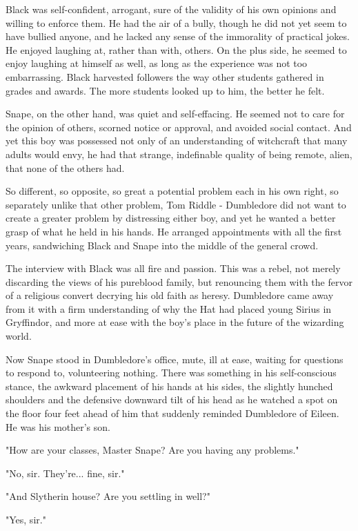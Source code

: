 \documentclass[a4paper,11pt]{article}
\begin{document}
Black was self-confident, arrogant, sure of the validity of his own opinions and willing to enforce them. He had the air of a bully, though he did not yet seem to have bullied anyone, and he lacked any sense of the immorality of practical jokes. He enjoyed laughing at, rather than with, others. On the plus side, he seemed to enjoy laughing at himself as well, as long as the experience was not too embarrassing. Black harvested followers the way other students gathered in grades and awards. The more students looked up to him, the better he felt.

Snape, on the other hand, was quiet and self-effacing. He seemed not to care for the opinion of others, scorned notice or approval, and avoided social contact. And yet this boy was possessed not only of an understanding of witchcraft that many adults would envy, he had that strange, indefinable quality of being remote, alien, that none of the others had.

So different, so opposite, so great a potential problem each in his own right, so separately unlike that other problem, Tom Riddle - Dumbledore did not want to create a greater problem by distressing either boy, and yet he wanted a better grasp of what he held in his hands. He arranged appointments with all the first years, sandwiching Black and Snape into the middle of the general crowd.

The interview with Black was all fire and passion. This was a rebel, not merely discarding the views of his pureblood family, but renouncing them with the fervor of a religious convert decrying his old faith as heresy. Dumbledore came away from it with a firm understanding of why the Hat had placed young Sirius in Gryffindor, and more at ease with the boy's place in the future of the wizarding world.

Now Snape stood in Dumbledore's office, mute, ill at ease, waiting for questions to respond to, volunteering nothing. There was something in his self-conscious stance, the awkward placement of his hands at his sides, the slightly hunched shoulders and the defensive downward tilt of his head as he watched a spot on the floor four feet ahead of him that suddenly reminded Dumbledore of Eileen. He was his mother's son.

"How are your classes, Master Snape? Are you having any problems."

"No, sir. They're... fine, sir."

"And Slytherin house? Are you settling in well?"

"Yes, sir."
\end{document}
